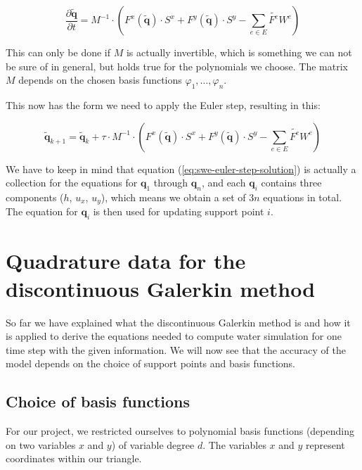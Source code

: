 \documentclass{article}
\newcommand{\pd}[2]{\dfrac{\partial #1}{\partial #2}}
\renewcommand{\phi}{\varphi}
\begin{document}
\begin{equation*}
  \pd{\tilde{\mathbf{q}}}{t} =
  M^{-1} \cdot \left(
    F^x(\tilde{\mathbf{q}}) \cdot S^x +
    F^y(\tilde{\mathbf{q}}) \cdot S^y -
    \sum_{e \in E} \tilde{F^e} W^e\right
  )
\end{equation*}

This can only be done if $M$ is actually invertible, which is something we can not be sure of in general, but holds true for the polynomials we choose.
The matrix $M$ depends on the chosen basis functions $\phi_1,\dots,\phi_n$.

This now has the form we need to apply the Euler step, resulting in this:

\begin{equation*}
  \label{eq:swe-euler-step-solution}
  \tilde{\mathbf{q}}_{k+1} =
  \tilde{\mathbf{q}}_{k} +
  \tau \cdot M^{-1} \cdot \left(
    F^x(\tilde{\mathbf{q}}) \cdot S^x +
    F^y(\tilde{\mathbf{q}}) \cdot S^y -
    \sum_{e \in E} \tilde{F^e} W^e\right
  )
\end{equation*}

We have to keep in mind that equation (\ref{eq:swe-euler-step-solution}) is actually a collection for the equations for $\mathbf{q}_1$ through $\mathbf{q}_n$, and each $\mathbf{q}_i$ contains three components ($h$, $u_x$, $u_y$), which means we obtain a set of $3n$ equations in total. The equation for $\mathbf{q}_i$ is then used for updating support point $i$.

\section{Quadrature data for the discontinuous Galerkin method}
\label{sec:basis-functions-choice}

So far we have explained what the discontinuous Galerkin method is and how it is applied to derive the equations needed to compute water simulation for one time step with the given information. We will now see that the accuracy of the model depends on the choice of support points and basis functions.

\subsection{Choice of basis functions}
\label{sec:basis-functions-choice-polynomial}

For our project, we restricted ourselves to polynomial basis functions (depending on two variables $x$ and $y$) of variable degree $d$. The variables $x$ and $y$ represent coordinates within our triangle.
\end{document}
